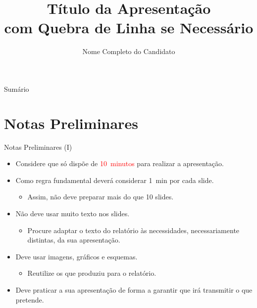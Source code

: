 \documentclass[
aspectratio=169,	%
LEEC,				%
portuguese,			%
]{DEEclassP}
\title{Título da Apresentação\\com Quebra de Linha se Necessário}
\author[Nome Curto do Candidato]{Nome Completo do Candidato}	%
\begin{document}
\begin{frame}
	\titlepage
\end{frame}

\begin{frame}{Sumário}
	\tableofcontents
\end{frame}

\section{Notas Preliminares}

\begin{frame}{Notas Preliminares (I)}

\setlstep{0.3cm}{0cm}{0cm}	%
\begin{itemize}
	\item Considere que só dispõe de \textcolor{red}{10~minutos} para realizar a apresentação.
	\item Como regra fundamental deverá considerar 1~min por cada slide.
	\begin{itemize}
		\item Assim, não deve preparar mais do que 10 slides.
	\end{itemize}
	\item Não deve usar muito texto nos slides.
	\begin{itemize}
		\item Procure adaptar o texto do relatório às necessidades, necessariamente distintas, da sua apresentação.
	\end{itemize}	
	\item Deve usar imagens, gráficos e esquemas.
	\begin{itemize}
		\item Reutilize os que produziu para o relatório.
	\end{itemize}	
	\item Deve praticar a sua apresentação de forma a garantir que irá transmitir o que pretende.
\end{itemize}

\end{frame}
\end{document}
